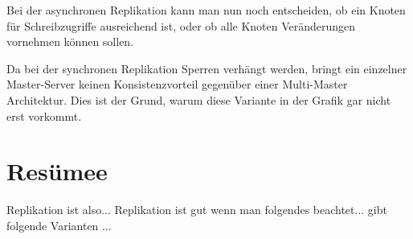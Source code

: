 Bei der asynchronen Replikation kann man nun noch entscheiden, ob ein Knoten für Schreibzugriffe ausreichend ist, oder ob alle Knoten Veränderungen vornehmen können sollen.

Da bei der synchronen Replikation Sperren verhängt werden, bringt ein einzelner Master-Server keinen Konsistenzvorteil gegenüber einer Multi-Master Architektur. Dies ist der Grund, warum diese Variante in der Grafik gar nicht erst vorkommt.

\section{Resümee}
Replikation ist also...
Replikation ist gut wenn man folgendes beachtet...
gibt folgende Varianten ...